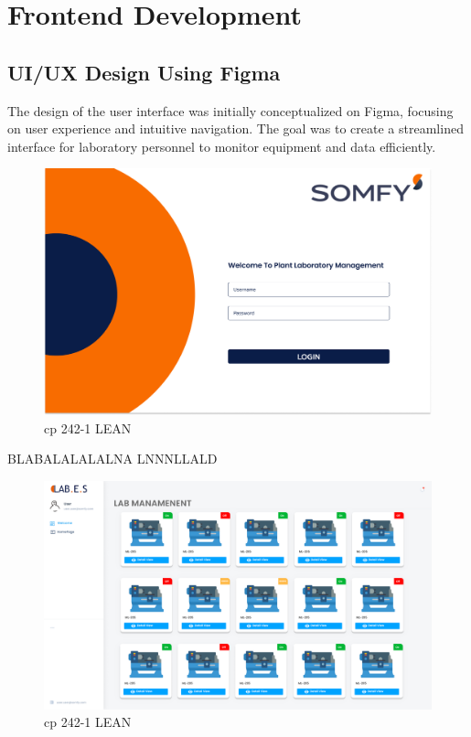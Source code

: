 

\section{Frontend Development}

\subsection{UI/UX Design Using Figma}
The design of the user interface was initially conceptualized on Figma, focusing on user experience and intuitive navigation. The goal was to create a streamlined interface for laboratory personnel to monitor equipment and data efficiently.

\begin{figure}[H]
    \centering
    \includegraphics[width=1\textwidth]{chapters/3/img/10.png}
    \caption{cp 242-1 LEAN}
    \label{fig:campus}
\end{figure}

BLABALALALALNA LNNNLLALD

\begin{figure}[H]
    \centering
    \includegraphics[width=1\textwidth]{chapters/3/img/12.png}
    \caption{cp 242-1 LEAN}
    \label{fig:campus}
\end{figure}



